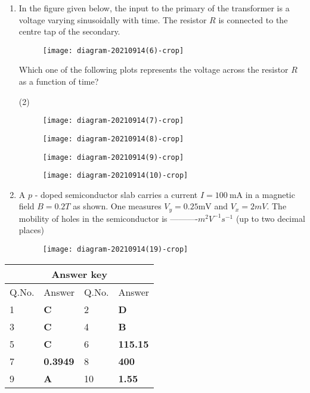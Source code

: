 \begin{enumerate}
	\item In the figure given below, the input to the primary of the transformer is a voltage varying sinusoidally with time. The resistor $R$ is connected to the centre tap of the secondary.\\
	\begin{figure}[H]
		\centering
		\texttt{[image: diagram-20210914(6)-crop]}
	\end{figure}
	Which one of the following plots represents the voltage across the resistor $R$ as a function of time?
	{}
\begin{tasks}(2)
\task[\textbf{A.}] \begin{figure}[H]
	\centering
	\texttt{[image: diagram-20210914(7)-crop]}
\end{figure}
\task[\textbf{B.}] \begin{figure}[H]
	\centering
	\texttt{[image: diagram-20210914(8)-crop]}
\end{figure}
\task[\textbf{C.}] \begin{figure}[H]
	\centering
	\texttt{[image: diagram-20210914(9)-crop]}
\end{figure}
\task[\textbf{D.}] 
\begin{figure}[H]
	\centering
	\texttt{[image: diagram-20210914(10)-crop]}
\end{figure}
\end{tasks}
	\item A $p$ - doped semiconductor slab carries a current $I=100 \mathrm{~mA}$ in a magnetic field $B=0.2 T$ as shown. One measures $V_{y}=0.25 \mathrm{mV}$ and $V_{x}=2 m V .$ The mobility of holes in the semiconductor is ----------$m^{2} V^{-1} s^{-1}$ (up to two decimal places)
{	}
\begin{figure}[H]
\centering
\texttt{[image: diagram-20210914(19)-crop]}
\end{figure}
\end{enumerate}
\setlength\arrayrulewidth{1pt}
\begin{table}[H]
	\centering
	\begin{tabular}{|p{1.5cm}|p{1.5cm}||p{1.5cm}|p{1.5cm}|}
		\hline
		\multicolumn{4}{|c|}{\textbf{Answer key}}\\\hline\hline
		\rowcolor{ocrel}Q.No.&Answer&Q.No.&Answer\\\hline
		1&\textbf{C} &2&\textbf{D}\\\hline 
		3&\textbf{C} &4&\textbf{B} \\\hline
		5&\textbf{C} &6&\textbf{115.15} \\\hline
		7&\textbf{0.3949}&8&\textbf{400}\\\hline
		9&\textbf{A}&10&\textbf{1.55}\\\hline
	\end{tabular}
\end{table}